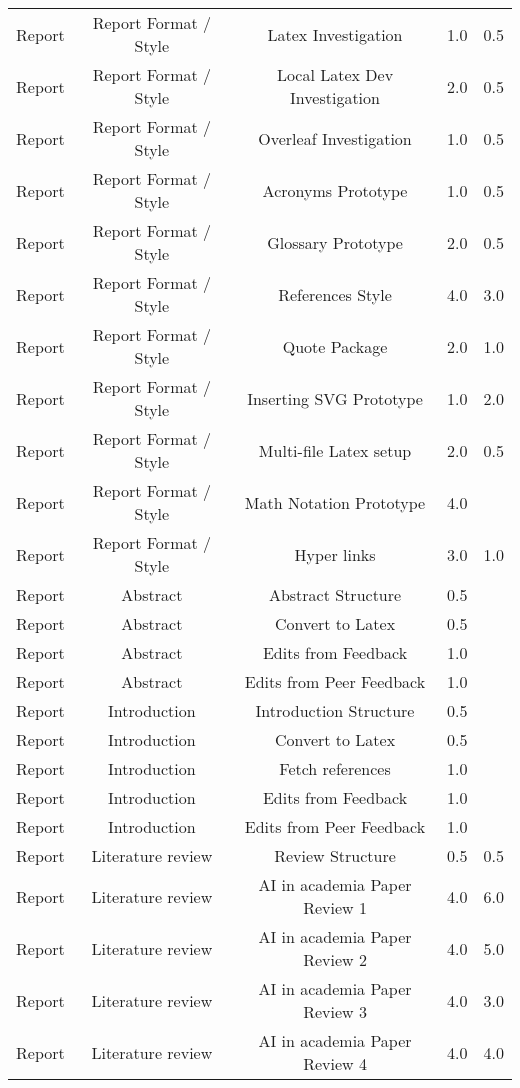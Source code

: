 \begin{longtable}{|c|c|c|c|c|}
	Report & Report Format / Style & Latex Investigation & 1.0 & 0.5 \\
	Report & Report Format / Style & Local Latex Dev Investigation & 2.0 & 0.5 \\
	Report & Report Format / Style & Overleaf Investigation & 1.0 & 0.5 \\
	Report & Report Format / Style & Acronyms Prototype & 1.0 & 0.5 \\
	Report & Report Format / Style & Glossary Prototype & 2.0 & 0.5 \\
	Report & Report Format / Style & References Style & 4.0 & 3.0 \\
	Report & Report Format / Style & Quote Package & 2.0 & 1.0 \\
	Report & Report Format / Style & Inserting SVG Prototype & 1.0 & 2.0 \\
	Report & Report Format / Style & Multi-file  Latex setup & 2.0 & 0.5 \\
	Report & Report Format / Style & Math Notation Prototype & 4.0 &  \\
	Report & Report Format / Style & Hyper links & 3.0 & 1.0 \\
	Report & Abstract & Abstract Structure & 0.5 &  \\
	Report & Abstract & Convert to Latex & 0.5 &  \\
	Report & Abstract & Edits from Feedback & 1.0 &  \\
	Report & Abstract & Edits from Peer Feedback & 1.0 &  \\
	Report & Introduction & Introduction Structure & 0.5 &  \\
	Report & Introduction & Convert to Latex & 0.5 &  \\
	Report & Introduction & Fetch references & 1.0 &  \\
	Report & Introduction & Edits from Feedback & 1.0 &  \\
	Report & Introduction & Edits from Peer Feedback & 1.0 &  \\
	Report & Literature review & Review Structure & 0.5 & 0.5 \\
	Report & Literature review & AI in academia Paper Review 1 & 4.0 & 6.0 \\
	Report & Literature review & AI in academia Paper Review 2 & 4.0 & 5.0 \\
	Report & Literature review & AI in academia Paper Review 3 & 4.0 & 3.0 \\
	Report & Literature review & AI in academia Paper Review 4 & 4.0 & 4.0 \\

\end{longtable}
